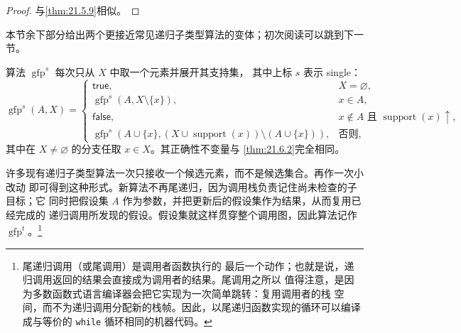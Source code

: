 \begin{proof}
与\cref{thm:21.5.9}相似。
\end{proof}


本节余下部分给出两个更接近常见递归子类型算法的变体；初次阅读可以跳到下一节。

\begin{definition}
\label{def:21.6.3}
算法 \(\operatorname{gfp}^s\) 每次只从 \(X\) 中取一个元素并展开其支持集，
其中上标 \(s\) 表示 single：
\[
\operatorname{gfp}^s(A,X)=
\begin{cases}
\mathsf{true},&X=\varnothing,\\
\operatorname{gfp}^s(A,X\setminus\{x\}),&x\in A,\\
\mathsf{false},&x\notin A\text{ 且 }\operatorname{support}(x)\uparrow,\\
\operatorname{gfp}^s(A\cup\{x\},
  (X\cup\operatorname{support}(x))\setminus(A\cup\{x\})),&\text{否则},
\end{cases}
\]
其中在 \(X\ne\varnothing\) 的分支任取 \(x\in X\)。其正确性不变量与
\cref{thm:21.6.2}完全相同。
\end{definition}

许多现有递归子类型算法一次只接收一个候选元素，而不是候选集合。再作一次小改动
即可得到这种形式。新算法不再尾递归，因为调用栈负责记住尚未检查的子目标；它
同时把假设集 \(A\) 作为参数，并把更新后的假设集作为结果，从而复用已经完成的
递归调用所发现的假设。假设集就这样贯穿整个调用图，因此算法记作
\(\operatorname{gfp}^t\)。\footnote{尾递归调用（或尾调用）是调用者函数执行的
最后一个动作；也就是说，递归调用返回的结果会直接成为调用者的结果。尾调用之所以
值得注意，是因为多数函数式语言编译器会把它实现为一次简单跳转：复用调用者的栈
空间，而不为递归调用分配新的栈帧。因此，以尾递归函数实现的循环可以编译成与等价的
\texttt{while} 循环相同的机器代码。}

